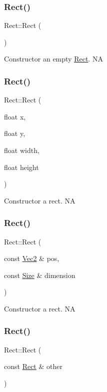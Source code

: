 \subsubsection{\texorpdfstring{Rect()}{Rect()}\hspace{0.1cm}{\footnotesize\ttfamily [5/8]}}
{\footnotesize\ttfamily Rect\+::\+Rect (\begin{DoxyParamCaption}{ }\end{DoxyParamCaption})}

Constructor an empty \hyperlink{classRect}{Rect}.  NA \mbox{\label{classRect_a2ccad9ce15ee46a8957448a0bafbb8e9}} 
\subsubsection{\texorpdfstring{Rect()}{Rect()}\hspace{0.1cm}{\footnotesize\ttfamily [6/8]}}
{\footnotesize\ttfamily Rect\+::\+Rect (\begin{DoxyParamCaption}\item[{float}]{x,  }\item[{float}]{y,  }\item[{float}]{width,  }\item[{float}]{height }\end{DoxyParamCaption})}

Constructor a rect.  NA \mbox{\label{classRect_a83b42c791d8ce7b8c08356755abe295c}} 
\subsubsection{\texorpdfstring{Rect()}{Rect()}\hspace{0.1cm}{\footnotesize\ttfamily [7/8]}}
{\footnotesize\ttfamily Rect\+::\+Rect (\begin{DoxyParamCaption}\item[{const \hyperlink{classVec2}{Vec2} \&}]{pos,  }\item[{const \hyperlink{classSize}{Size} \&}]{dimension }\end{DoxyParamCaption})}

Constructor a rect.  NA \mbox{\label{classRect_a82f6b6e265c6c9ef8c644e2d0660a2bb}} 
\subsubsection{\texorpdfstring{Rect()}{Rect()}\hspace{0.1cm}{\footnotesize\ttfamily [8/8]}}
{\footnotesize\ttfamily Rect\+::\+Rect (\begin{DoxyParamCaption}\item[{const \hyperlink{classRect}{Rect} \&}]{other }\end{DoxyParamCaption})}

